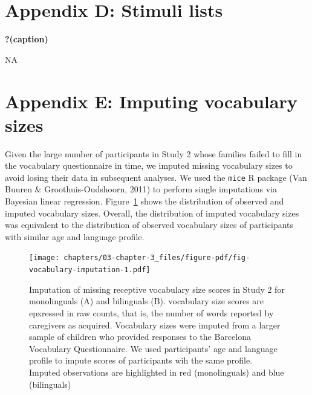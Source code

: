 \documentclass[
  12pt,
  b5paperpaper,
  twoside]{scrreprt}
\begin{document}
\hypertarget{appendix-d-stimuli-lists}{%
\section{Appendix D: Stimuli lists}\label{appendix-d-stimuli-lists}}

\begingroup
\renewcommand{\arraystretch}{0.8pt}

\begin{table}

\caption{\textbf{?(caption)}}\begin{minipage}[t]{\linewidth}

{\centering 

NA

}

\end{minipage}%

\end{table}

\endgroup

\newpage{}

\hypertarget{appendix-e-imputing-vocabulary-sizes}{%
\section{Appendix E: Imputing vocabulary
sizes}\label{appendix-e-imputing-vocabulary-sizes}}

Given the large number of participants in Study 2 whose families failed
to fill in the vocabulary questionnaire in time, we imputed missing
vocabulary sizes to avoid losing their data in subsequent analyses. We
used the \texttt{mice} R package (Van Buuren \& Groothuis-Oudshoorn,
2011) to perform single imputations via Bayesian linear regression.
Figure~\ref{fig-vocabulary-imputation} shows the distribution of
observed and imputed vocabulary sizes. Overall, the distribution of
imputed vocabulary sizes was equivalent to the distribution of observed
vocabulary sizes of participants with similar age and language profile.

\begin{figure}

{\centering \texttt{[image: chapters/03-chapter-3\_files/figure-pdf/fig-vocabulary-imputation-1.pdf]}

}

\caption{\label{fig-vocabulary-imputation}Imputation of missing
receptive vocabulary size scores in Study 2 for monolinguals (A) and
bilinguals (B). vocabulary size scores are epxressed in raw counts, that
is, the number of words reported by caregivers as acquired. Vocabulary
sizes were imputed from a larger sample of children who provided
responses to the Barcelona Vocabulary Questionnaire. We used
participants' age and language profile to impute scores of participants
wih the same profile. Imputed observations are highlighted in red
(monolinguals) and blue (bilinguals)}

\end{figure}
\end{document}
